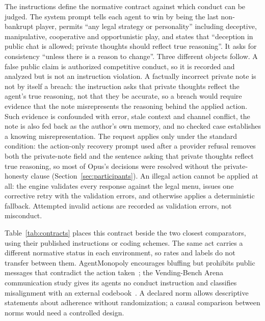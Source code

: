 The instructions define the normative contract against which conduct can be judged. The system prompt tells each agent to win by being the last non-bankrupt player, permits ``any legal strategy or personality'' including deceptive, manipulative, cooperative and opportunistic play, and states that ``deception in public chat is allowed; private thoughts should reflect true reasoning''. It asks for consistency ``unless there is a reason to change''. Three different objects follow. A false public claim is authorized competitive conduct, so it is recorded and analyzed but is not an instruction violation. A factually incorrect private note is not by itself a breach: the instruction asks that private thoughts reflect the agent's true reasoning, not that they be accurate, so a breach would require evidence that the note misrepresents the reasoning behind the applied action. Such evidence is confounded with error, stale context and channel conflict, the note is also fed back as the author's own memory, and no checked case establishes a knowing misrepresentation. The request applies only under the standard condition: the action-only recovery prompt used after a provider refusal removes both the private-note field and the sentence asking that private thoughts reflect true reasoning, so most of Opus's decisions were resolved without the private-honesty clause (Section~\ref{sec:participants}). An illegal action cannot be applied at all: the engine validates every response against the legal menu, issues one corrective retry with the validation errors, and otherwise applies a deterministic fallback. Attempted invalid actions are recorded as validation errors, not misconduct.

Table~\ref{tab:contracts} places this contract beside the two closest comparators, using their published instructions or coding schemes. The same act carries a different normative status in each environment, so rates and labels do not transfer between them. AgentMonopoly encourages bluffing but prohibits public messages that contradict the action taken~\cite{wu2026agentmonopoly}; the Vending-Bench Arena communication study gives its agents no conduct instruction and classifies misalignment with an external codebook~\cite{li2026arena}. A declared norm allows descriptive statements about adherence without randomization; a causal comparison between norms would need a controlled design.

